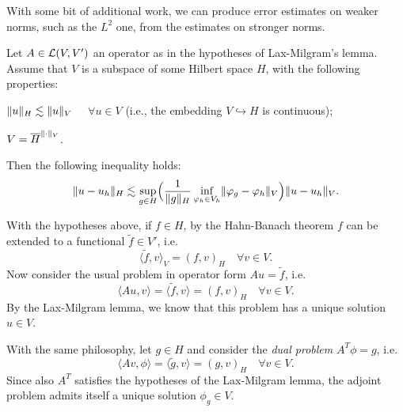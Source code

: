 With some bit of additional work, we can produce error estimates on weaker norms, such as the $L^2$ one, from the estimates on stronger norms.
\begin{lemma}[Nitsche] \label{lemma:nitsche}
Let $A \in \mathcal{L}(V,V')$ an operator as in the hypotheses of Lax-Milgram's lemma. Assume that $V$ is a subspace of some Hilbert space $H$, with the following properties:
\begin{romanlist}
\item $\lVert u\rVert_H \lesssim \lVert u\rVert_V$ $\quad \forall u \in V$ \quad (i.e., the embedding $V \hookrightarrow H$ is continuous);
\item $V = \overline{H}^{\lVert\cdot\rVert_V}$.
\end{romanlist}
Then the following inequality holds:
\begin{equation}\label{eqn:nitsche_lemma}
\lVert u-u_h\rVert_H \lesssim \sup_{g \in H} \Bigl( \frac{1}{\lVert g\rVert_H} \inf_{\varphi_h \in V_h} \lVert\varphi_g - \varphi_h\rVert_V \Bigr) \lVert u-u_h\rVert_V .
\end{equation}
\end{lemma}

\begin{remark}
With the hypotheses above, if $f \in H$, by the Hahn-Banach theorem $f$ can be extended to a functional $\tilde{f} \in V'$, i.e.
\[
\langle \tilde{f}, v \rangle_V = (f, v)_H \quad \forall v \in V.
\]
Now consider the usual problem in operator form $A u = \tilde{f}$, i.e.
\begin{equation}
\langle Au,v \rangle = \langle \tilde{f},v \rangle = (f, v)_H \quad \forall v\in V.
\end{equation}
By the Lax-Milgram lemma, we know that this problem has a unique solution $u \in V$.

With the same philosophy, let $g \in H$ and consider the \emph{dual problem} $A^T \phi = g$, i.e.
\begin{equation}
\langle Av,\phi \rangle = \langle \tilde{g},v \rangle = (g, v)_H \quad \forall v\in V.
\end{equation}
Since also $A^T$ satisfies the hypotheses of the Lax-Milgram lemma, the adjoint problem admits itself a unique solution $\phi_g \in V$.
\end{remark}

